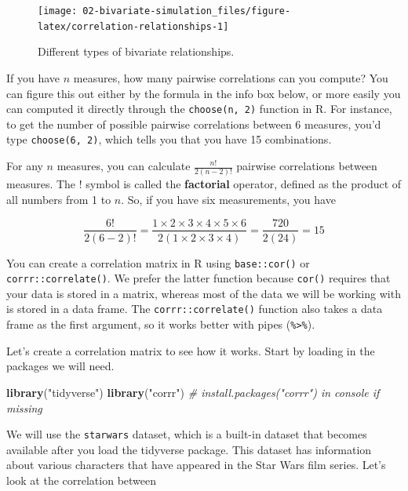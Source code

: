 \documentclass[]{book}
\newenvironment{Shaded}{\begin{snugshade}}{\end{snugshade}}
\newcommand{\CommentTok}[1]{\textcolor[rgb]{0.56,0.35,0.01}{\textit{#1}}}
\newcommand{\KeywordTok}[1]{\textcolor[rgb]{0.13,0.29,0.53}{\textbf{#1}}}
\newcommand{\NormalTok}[1]{#1}
\newcommand{\StringTok}[1]{\textcolor[rgb]{0.31,0.60,0.02}{#1}}
\begin{document}
\begin{figure}

{\centering \texttt{[image: 02-bivariate-simulation\_files/figure-latex/correlation-relationships-1]} 

}

\caption{Different types of bivariate relationships.}\label{fig:correlation-relationships}
\end{figure}

If you have \(n\) measures, how many pairwise correlations can you compute? You can figure this out either by the formula in the info box below, or more easily you can computed it directly through the \texttt{choose(n,\ 2)} function in R. For instance, to get the number of possible pairwise correlations between 6 measures, you'd type \texttt{choose(6,\ 2)}, which tells you that you have 15 combinations.

For any \(n\) measures, you can calculate \(\frac{n!}{2(n - 2)!}\) pairwise correlations between measures. The \(!\) symbol is called the \textbf{factorial} operator, defined as the product of all numbers from 1 to \(n\). So, if you have six measurements, you have

\[
\frac{6!}{2(6-2)!} = \frac{1 \times 2 \times 3 \times 4 \times 5 \times 6}{2\left(1 \times 2 \times 3 \times 4\right)} = \frac{720}{2(24)} = 15
\]

You can create a correlation matrix in R using \texttt{base::cor()} or \texttt{corrr::correlate()}. We prefer the latter function because \texttt{cor()} requires that your data is stored in a matrix, whereas most of the data we will be working with is stored in a data frame. The \texttt{corrr::correlate()} function also takes a data frame as the first argument, so it works better with pipes (\texttt{\%\textgreater{}\%}).

Let's create a correlation matrix to see how it works. Start by loading in the packages we will need.

\begin{Shaded}
\begin{Highlighting}[]
\KeywordTok{library}\NormalTok{(}\StringTok{"tidyverse"}\NormalTok{)}
\KeywordTok{library}\NormalTok{(}\StringTok{"corrr"}\NormalTok{)  }\CommentTok{# install.packages("corrr") in console if missing}
\end{Highlighting}
\end{Shaded}

We will use the \texttt{starwars} dataset, which is a built-in dataset that becomes available after you load the tidyverse package. This dataset has information about various characters that have appeared in the Star Wars film series. Let's look at the correlation between
\end{document}
